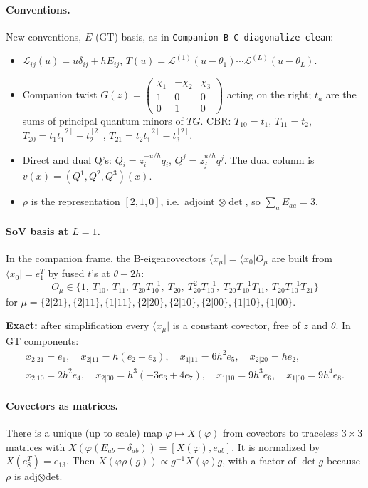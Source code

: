 \documentclass[11pt]{article}
\newcommand{\bra}[1]{\langle #1|}
\begin{document}
\paragraph{Conventions.} New conventions, $E$ (GT) basis, as in \texttt{Companion-B-C-diagonalize-clean}:
\begin{itemize}
\item $\mathcal L_{ij}(u)=u\delta_{ij}+hE_{ij}$, $T(u)=\mathcal L^{(1)}(u-\theta_1)\cdots\mathcal L^{(L)}(u-\theta_L)$.
\item Companion twist $G(z)=\begin{pmatrix}\chi_1&-\chi_2&\chi_3\\1&0&0\\0&1&0\end{pmatrix}$ acting on the right; $t_a$ are the sums of principal quantum minors of $TG$. CBR: $T_{10}=t_1$, $T_{11}=t_2$, $T_{20}=t_1t_1^{[2]}-t_2^{[2]}$, $T_{21}=t_2t_1^{[2]}-t_3^{[2]}$.
\item Direct and dual Q's: $Q_i=z_i^{-u/h}q_i$, $Q^j=z_j^{u/h}q^j$. The dual column is $v(x)=(Q^1,Q^2,Q^3)(x)$.
\item $\rho$ is the representation $[2,1,0]$, i.e.\ adjoint $\otimes\det$, so $\sum_aE_{aa}=3$.
\end{itemize}

\paragraph{SoV basis at $L=1$.} In the companion frame, the B-eigencovectors $\bra{x_\mu}=\bra{x_0}O_\mu$ are built from $\bra{x_0}=e_1^T$ by fused $t$'s at $\theta-2h$:
\[
O_\mu\in\{1,\ T_{10},\ T_{11},\ T_{20}T_{10}^{-1},\ T_{20},\ T_{20}^2T_{10}^{-1},\ T_{20}T_{10}^{-1}T_{11},\ T_{20}T_{10}^{-1}T_{21}\}
\]
for $\mu=\{2|21\},\{2|11\},\{1|11\},\{2|20\},\{2|10\},\{2|00\},\{1|10\},\{1|00\}$.

\textbf{Exact:} after simplification every $\bra{x_\mu}$ is a constant covector, free of $z$ and $\theta$. In GT components:
\[
\begin{gathered}
x_{2|21}=e_1,\quad x_{2|11}=h(e_2+e_3),\quad x_{1|11}=6h^2e_5,\quad x_{2|20}=he_2,\\
x_{2|10}=2h^2e_4,\quad x_{2|00}=h^3(-3e_6+4e_7),\quad x_{1|10}=9h^3e_6,\quad x_{1|00}=9h^4e_8.
\end{gathered}
\]

\paragraph{Covectors as matrices.} There is a unique (up to scale) map $\varphi\mapsto X(\varphi)$ from covectors to traceless $3\times3$ matrices with $X(\varphi(E_{ab}-\delta_{ab}))=[X(\varphi),e_{ab}]$. It is normalized by $X(e_8^T)=e_{13}$. Then $X(\varphi\rho(g))\propto g^{-1}X(\varphi)g$, with a factor of $\det g$ because $\rho$ is adj$\otimes$det.
\end{document}
